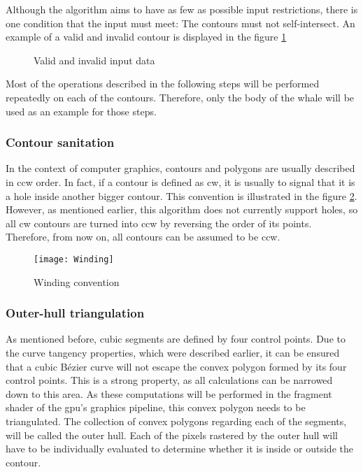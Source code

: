 \documentclass[\topdir/main.tex]{subfiles}
\begin{document}
Although the algorithm aims to have as few as possible input restrictions, there is one condition that the input must meet: The contours must not self-intersect. An example of a valid and invalid contour is displayed in the figure \ref{fig:a01:valid}\newline

\begin{figure}[hbtp]
    \centering

    \caption{Valid and invalid input data}
    \label{fig:a01:valid}
\end{figure}

Most of the operations described in the following steps will be performed repeatedly on each of the contours. Therefore, only the body of the whale will be used as an example for those steps.\newline

\subsubsection{Contour sanitation}
In the context of computer graphics, contours and polygons are usually described in \gls{ccw} order. In fact, if a contour is defined as \gls{cw}, it is usually to signal that it is a hole inside another bigger contour. This convention is illustrated in the figure \ref{fig:a01:winding}. However, as mentioned earlier, this algorithm does not currently support holes, so all \gls{cw} contours are turned into \gls{ccw} by reversing the order of its points. Therefore, from now on, all contours can be assumed to be \gls{ccw}.\newline

\begin{figure}[hbtp]
    \centering
    \texttt{[image: Winding]}

    \caption{Winding convention}
    \label{fig:a01:winding}
\end{figure}


\subsubsection{Outer-hull triangulation}
As mentioned before, cubic segments are defined by four control points. Due to the curve tangency properties, which were described earlier, it can be ensured that a cubic Bézier curve will not escape the convex polygon formed by its four control points. This is a strong property, as all calculations can be narrowed down to this area. As these computations will be performed in the fragment shader of the \gls{gpu}'s graphics pipeline, this convex polygon needs to be triangulated. The collection of convex polygons regarding each of the segments, will be called the outer hull. Each of the pixels rastered by the outer hull will have to be individually evaluated to determine whether it is inside or outside the contour.\newline 
\end{document}
